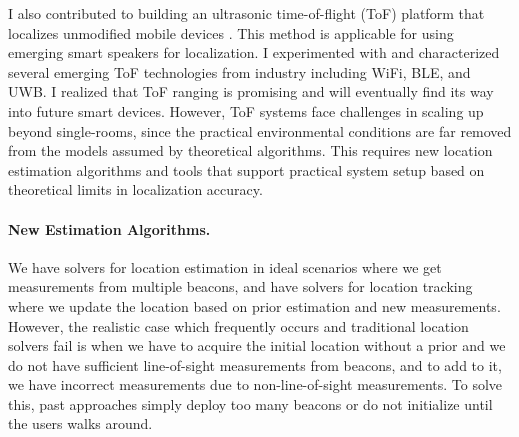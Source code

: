\documentclass[10pt]{article}
\begin{document}
I also contributed to building an ultrasonic time-of-flight (ToF) platform that localizes unmodified mobile devices \cite{rtas-alps-platform, lazik2015alps,lazik2015alpsdemo}. This method is applicable for using emerging smart speakers for localization. I experimented with and characterized several emerging ToF technologies from industry including WiFi, BLE, and UWB. %
I realized that ToF ranging is promising and will eventually find its way into future smart devices.  However, ToF systems face challenges in scaling up beyond single-rooms, since the practical environmental conditions are far removed from the models assumed by theoretical algorithms. This requires new location estimation algorithms and tools that support practical system setup based on theoretical limits in localization accuracy. %


\paragraph{New Estimation Algorithms. } 
We have solvers for location estimation in ideal scenarios where we get measurements from multiple beacons, and have solvers for location tracking where we update the location based on prior estimation and new measurements. However, the realistic case which frequently occurs and traditional location solvers fail is  when we have to acquire the initial location without a prior and we do not have sufficient line-of-sight measurements from beacons, and to add to it, we have incorrect measurements due to non-line-of-sight measurements. To solve this, past approaches simply deploy too many beacons or do not initialize until the users walks around.
\end{document}
